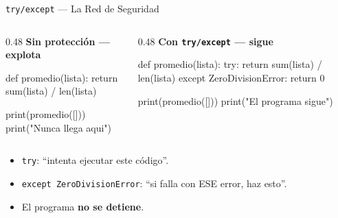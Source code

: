 \documentclass[aspectratio=169, 11pt]{beamer}
\begin{document}
\begin{frame}[fragile,shrink=28]{\texttt{try/except} --- La Red de Seguridad}
  \vspace{-6pt}
  \begin{columns}[T]
    \begin{column}{0.48\textwidth}
      {\scriptsize\color{arcaRed}\bfseries\faTimesCircle\hspace{4pt}
        Sin protección --- explota}
      \begin{pyblock}[minted options={fontsize=\scriptsize, breaklines}]
def promedio(lista):
    return sum(lista) / len(lista)

print(promedio([]))
print("Nunca llega aqui")
      \end{pyblock}
    \end{column}

    \begin{column}{0.48\textwidth}
      {\scriptsize\color{codeGreen}\bfseries\faCheckCircle\hspace{4pt}
        Con \texttt{try/except} --- sigue}
      \begin{pyblock}[minted options={fontsize=\scriptsize, breaklines}]
def promedio(lista):
    try:
        return sum(lista) / len(lista)
    except ZeroDivisionError:
        return 0

print(promedio([]))
print("El programa sigue")
      \end{pyblock}
    \end{column}
  \end{columns}

  \vspace{4pt}
  {\scriptsize\color{textMuted}
  \begin{itemize}\setlength{\itemsep}{3pt}
    \item[{\color{arcaRed}\scriptsize\faArrowRight}]
      \texttt{try}: ``intenta ejecutar este código''.
    \item[{\color{arcaRed}\scriptsize\faArrowRight}]
      \texttt{except ZeroDivisionError}: ``si falla con ESE error, haz esto''.
    \item[{\color{arcaRed}\scriptsize\faArrowRight}]
      El programa \textbf{no se detiene}.
  \end{itemize}
  }
\end{frame}
\end{document}
